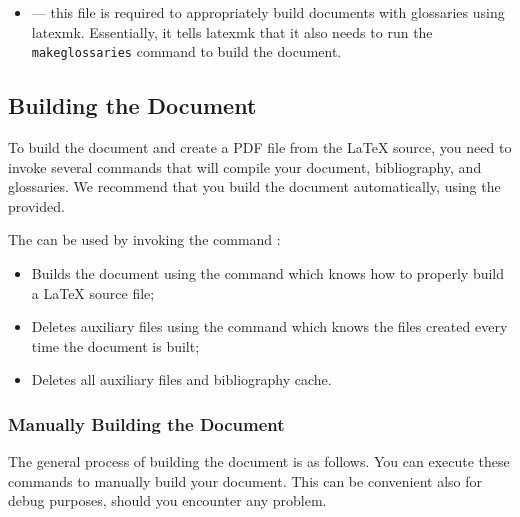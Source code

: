\begin{itemize}
	\item {} --- this file is required to appropriately build documents with glossaries using latexmk. Essentially, it tells latexmk that it also needs to run the \texttt{makeglossaries} command to build the document.
\end{itemize}


\subsection{Building the Document}

To build the document and create a PDF file from the \LaTeX{} source, you need to invoke several commands that will compile your document, bibliography, and glossaries. We recommend that you build the document automatically, using the  provided.

The  can be used by invoking the command :
\begin{itemize}
	\item {}
	
	Builds the document using the command  which knows how to properly build a \LaTeX{} source file;

	\item {}
	
	Deletes auxiliary files using the command  which knows the files created every time the document is built;
	\item {}
	
	Deletes all auxiliary files and bibliography cache.
\end{itemize}


\subsubsection*{Manually Building the Document}

The general process of building the document is as follows. You can execute these commands to manually build your document. This can be convenient also for debug purposes, should you encounter any problem.

